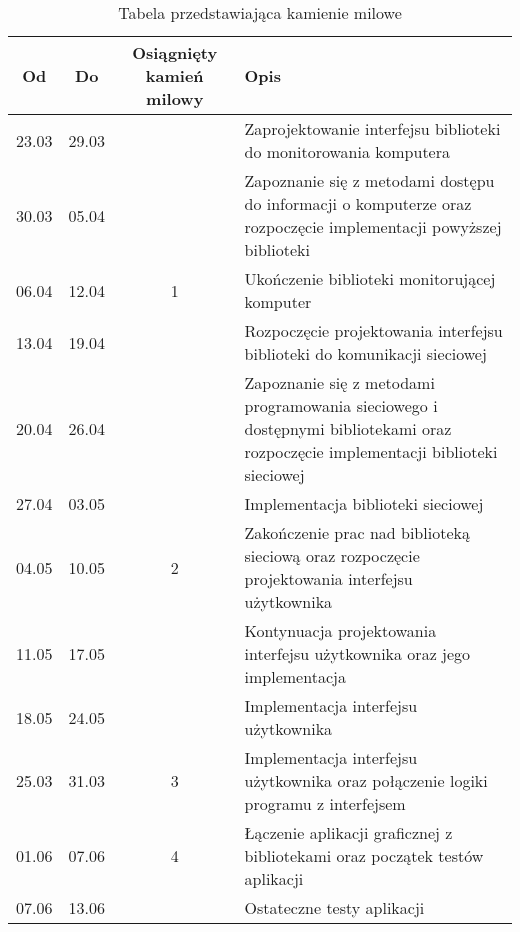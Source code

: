 \documentclass[a4paper]{article}
\begin{document}
		\begin{table}[h]
			\centering
			\begin{tabularx}{0.8\textwidth}{|c|c|c|X|}
				\hline
				Od & Do & Osiągnięty kamień milowy & Opis \\ \hline
				23.03 & 29.03 &  & Zaprojektowanie interfejsu biblioteki do monitorowania komputera \\ \hline
				30.03 & 05.04 &  & Zapoznanie się z metodami dostępu do informacji o komputerze oraz rozpoczęcie implementacji powyższej biblioteki\\ \hline
				06.04 & 12.04 & 1 & Ukończenie biblioteki monitorującej komputer  \\ \hline
				13.04 & 19.04 &   & Rozpoczęcie projektowania interfejsu biblioteki do komunikacji sieciowej \\ \hline
				20.04 & 26.04 &  & Zapoznanie się z metodami programowania sieciowego i dostępnymi bibliotekami oraz  rozpoczęcie implementacji biblioteki sieciowej\\ \hline
				27.04 & 03.05 &  & Implementacja biblioteki sieciowej \\ \hline
				04.05 & 10.05 & 2 & Zakończenie prac nad biblioteką sieciową oraz rozpoczęcie projektowania interfejsu użytkownika \\ \hline
				11.05 & 17.05 &    & Kontynuacja projektowania interfejsu użytkownika oraz jego implementacja \\ \hline
				18.05 & 24.05 &  & Implementacja interfejsu użytkownika \\ \hline
				25.03 & 31.03 & 3 & Implementacja interfejsu użytkownika oraz połączenie logiki programu z interfejsem \\ \hline
				01.06 & 07.06 & 4 & Łączenie aplikacji graficznej z bibliotekami oraz początek testów aplikacji \\ \hline
				07.06 & 13.06 &  & Ostateczne testy aplikacji \\ \hline
			\end{tabularx}
			\caption{Tabela przedstawiająca kamienie milowe}
			\label{tabela_harmonogram}
		\end{table}
		
\end{document}
